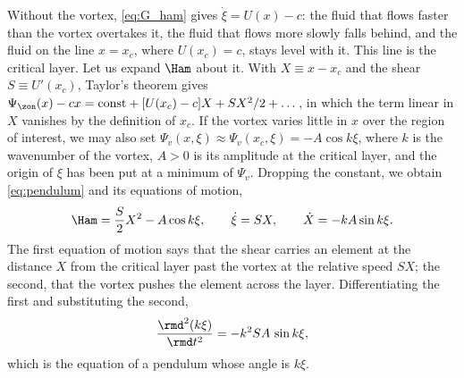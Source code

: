 Without the vortex, \cref{eq:G_ham} gives \(\dot\xi = U(x) - c\): the fluid that flows faster than the vortex overtakes it, the fluid that flows more slowly falls behind, and the fluid on the line \(x = x_c\), where \(U(x_c) = c\), stays level with it. This line is the critical layer. Let us expand \(\Ham\) about it. With \(X \equiv x - x_c\) and the shear \(S \equiv U'(x_c)\), Taylor's theorem gives \(\Psi_\zon(x) - cx = \text{const} + [U(x_c) - c]X + SX^2/2 + \dots\), in which the term linear in \(X\) vanishes by the definition of \(x_c\). If the vortex varies little in \(x\) over the region of interest, we may also set \(\Psi_v(x, \xi) \approx \Psi_v(x_c, \xi) = -A\cos k\xi\), where \(k\) is the wavenumber of the vortex, \(A > 0\) is its amplitude at the critical layer, and the origin of \(\xi\) has been put at a minimum of \(\Psi_v\). Dropping the constant, we obtain \cref{eq:pendulum} and its equations of motion,
\begin{equation}
\Ham = \frac{S}{2}X^2 - A\cos k\xi,
\qquad
\dot\xi = SX,
\qquad
\dot X = -kA\sin k\xi.
\label{eq:G_pendulum}
\end{equation}
The first equation of motion says that the shear carries an element at the distance \(X\) from the critical layer past the vortex at the relative speed \(SX\); the second, that the vortex pushes the element across the layer. Differentiating the first and substituting the second,
\begin{equation}
\frac{\rmd^2(k\xi)}{\rmd t^2} = -k^2SA\,\sin k\xi,
\label{eq:G_pend_eq}
\end{equation}
which is the equation of a pendulum whose angle is \(k\xi\).

